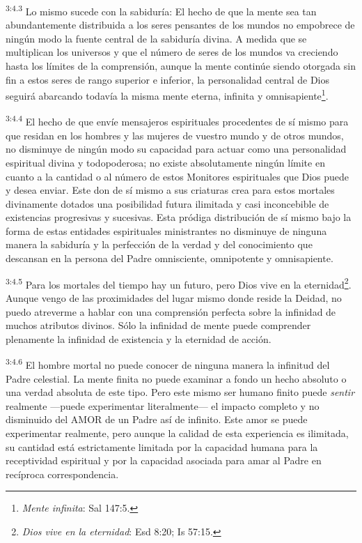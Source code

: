 \par
\textsuperscript{3:4.3} Lo mismo sucede con la sabiduría: El hecho de que la mente sea tan abundantemente distribuida a los seres pensantes de los mundos no empobrece de ningún modo la fuente central de la sabiduría divina. A medida que se multiplican los universos y que el número de seres de los mundos va creciendo hasta los límites de la comprensión, aunque la mente continúe siendo otorgada sin fin a estos seres de rango superior e inferior, la personalidad central de Dios seguirá abarcando todavía la misma mente eterna, infinita y omnisapiente\footnote{\textit{Mente infinita}: Sal 147:5.}.

\par
\textsuperscript{3:4.4} El hecho de que envíe mensajeros espirituales procedentes de sí mismo para que residan en los hombres y las mujeres de vuestro mundo y de otros mundos, no disminuye de ningún modo su capacidad para actuar como una personalidad espiritual divina y todopoderosa; no existe absolutamente ningún límite en cuanto a la cantidad o al número de estos Monitores espirituales que Dios puede y desea enviar. Este don de sí mismo a sus criaturas crea para estos mortales divinamente dotados una posibilidad futura ilimitada y casi inconcebible de existencias progresivas y sucesivas. Esta pródiga distribución de sí mismo bajo la forma de estas entidades espirituales ministrantes no disminuye de ninguna manera la sabiduría y la perfección de la verdad y del conocimiento que descansan en la persona del Padre omnisciente, omnipotente y omnisapiente.

\par
\textsuperscript{3:4.5} Para los mortales del tiempo hay un futuro, pero Dios vive en la eternidad\footnote{\textit{Dios vive en la eternidad}: Esd 8:20; Is 57:15.}. Aunque vengo de las proximidades del lugar mismo donde reside la Deidad, no puedo atreverme a hablar con una comprensión perfecta sobre la infinidad de muchos atributos divinos. Sólo la infinidad de mente puede comprender plenamente la infinidad de existencia y la eternidad de acción.

\par
\textsuperscript{3:4.6} El hombre mortal no puede conocer de ninguna manera la infinitud del Padre celestial. La mente finita no puede examinar a fondo un hecho absoluto o una verdad absoluta de este tipo. Pero este mismo ser humano finito puede \textit{sentir} realmente ---puede experimentar literalmente--- el impacto completo y no disminuido del AMOR de un Padre así de infinito. Este amor se puede experimentar realmente, pero aunque la calidad de esta experiencia es ilimitada, su cantidad está estrictamente limitada por la capacidad humana para la receptividad espiritual y por la capacidad asociada para amar al Padre en recíproca correspondencia.


